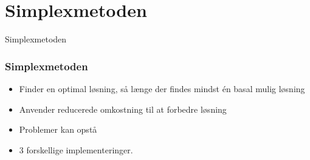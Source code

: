 
\section{Simplexmetoden}
\begin{frame}
\centering
\Huge
Simplexmetoden
\end{frame}
%
\begin{frame}
\frametitle{Simplexmetoden}
\begin{itemize}
\item Finder en optimal løsning, så længe der findes mindst én basal mulig løsning
\item Anvender reducerede omkostning til at forbedre løsning
\item Problemer kan opstå
\item 3 forskellige implementeringer.
\end{itemize}
\end{frame}